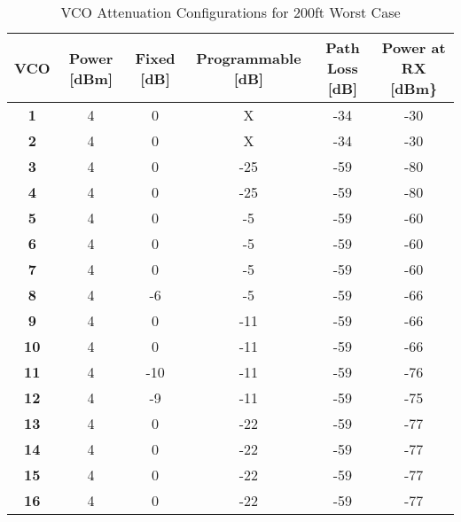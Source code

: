\begin{table}[]
\begin{tabular}{c||ccccc}
\textbf{VCO} & Power {[}dBm{]} & Fixed {[}dB{]} & Programmable {[}dB{]} & Path Loss {[}dB{]} & Power at RX {[}dBm\} \\ \hline
\textbf{1}   & 4               & 0              & X                     & -34                & -30                  \\
\textbf{2}   & 4               & 0              & X                     & -34                & -30                  \\ \hline


\textbf{3}   & 4               & 0              & -25                   & -59                & -80                  \\
\textbf{4}   & 4               & 0              & -25                   & -59                & -80                  \\ \hline


\textbf{5}   & 4               & 0              & -5                    & -59                & -60                  \\
\textbf{6}   & 4               & 0              & -5                    & -59                & -60                  \\
\textbf{7}   & 4               & 0              & -5                    & -59                & -60                  \\
\textbf{8}   & 4               & -6             & -5                    & -59                & -66                  \\ \hline


\textbf{9}   & 4               & 0              & -11                   & -59                & -66                  \\
\textbf{10}  & 4               & 0              & -11                   & -59                & -66                  \\
\textbf{11}  & 4               & -10            & -11                   & -59               & -76                  \\
\textbf{12}  & 4               & -9             & -11                   & -59                & -75                  \\ \hline


\textbf{13}  & 4               & 0              & -22                   & -59                & -77                  \\
\textbf{14}  & 4               & 0              & -22                   & -59                & -77                  \\
\textbf{15}  & 4               & 0              & -22                   & -59                & -77                  \\
\textbf{16}  & 4               & 0              & -22                   & -59                & -77                 
\end{tabular}
\caption{VCO Attenuation Configurations for 200ft Worst Case}
\label{tab:VCO_Pow}
\end{table}
